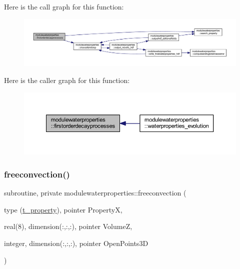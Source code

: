 Here is the call graph for this function\+:\nopagebreak
\begin{figure}[H]
\begin{center}
\leavevmode
\includegraphics[width=350pt]{namespacemodulewaterproperties_a8e4fffcfd269b64a4795cf007ee2b707_cgraph}
\end{center}
\end{figure}
Here is the caller graph for this function\+:\nopagebreak
\begin{figure}[H]
\begin{center}
\leavevmode
\includegraphics[width=350pt]{namespacemodulewaterproperties_a8e4fffcfd269b64a4795cf007ee2b707_icgraph}
\end{center}
\end{figure}
\mbox{\label{namespacemodulewaterproperties_a2ac3ef009338f33bfef1ccc910ccf6d7}} 
\subsubsection{\texorpdfstring{freeconvection()}{freeconvection()}}
{\footnotesize\ttfamily subroutine, private modulewaterproperties\+::freeconvection (\begin{DoxyParamCaption}\item[{type (\mbox{\hyperlink{structmodulewaterproperties_1_1t__property}{t\+\_\+property}}), pointer}]{PropertyX,  }\item[{real(8), dimension(\+:,\+:,\+:), pointer}]{VolumeZ,  }\item[{integer, dimension(\+:,\+:,\+:), pointer}]{Open\+Points3D }\end{DoxyParamCaption})\hspace{0.3cm}{\ttfamily [private]}}

